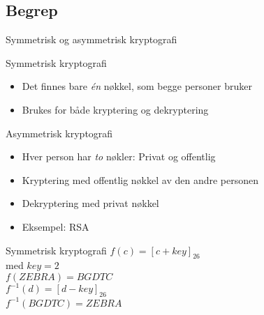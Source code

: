 \subsection*{Begrep}
\begin{frame}{Symmetrisk og asymmetrisk kryptografi}
\begin{block}{Symmetrisk kryptografi}
\begin{itemize}
\item Det finnes bare \textit{én} nøkkel, som begge personer bruker
\item Brukes for både kryptering og dekryptering
\end{itemize}
\end{block}
\pause
\begin{block}{Asymmetrisk kryptografi}
\begin{itemize}
\item Hver person har \textit{to} nøkler: Privat og offentlig
\item Kryptering med offentlig nøkkel av den andre personen
\item Dekryptering med privat nøkkel
\item Eksempel: RSA
\end{itemize}
\end{block}
\end{frame}

\begin{frame}{Symmetrisk kryptografi}
    $f(c)=[c+key]_{26}$\\
    med $key=2$\\
    $f(ZEBRA)=BGDTC$\\
    
    $f^{-1}(d)=[d-key]_{26}$\\
    $f^{-1}(BGDTC)=ZEBRA$
\end{frame}